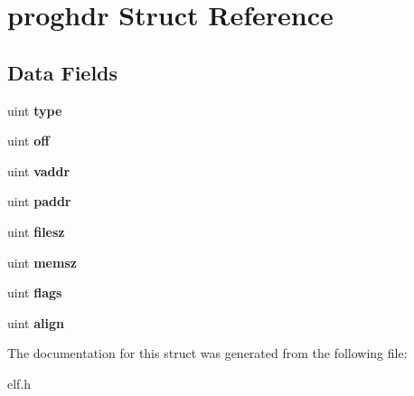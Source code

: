 \hypertarget{structproghdr}{}\section{proghdr Struct Reference}
\label{structproghdr}
\subsection*{Data Fields}
\begin{DoxyCompactItemize}
\item 
\mbox{\label{structproghdr_a42ea22dcdaa75a9cbdf7cd366b85e9ea}} 
uint {\bfseries type}
\item 
\mbox{\label{structproghdr_a979532386fd448596cc5046339a2cd2d}} 
uint {\bfseries off}
\item 
\mbox{\label{structproghdr_a6fa1051e19935bbedc5eaf086f5330b4}} 
uint {\bfseries vaddr}
\item 
\mbox{\label{structproghdr_af65905aa5c4ccb33aac7dad5783e14d9}} 
uint {\bfseries paddr}
\item 
\mbox{\label{structproghdr_a95dee0f1864ec1602f1ff6998ac00df0}} 
uint {\bfseries filesz}
\item 
\mbox{\label{structproghdr_a9f703ade191af1054b3de797d8167d89}} 
uint {\bfseries memsz}
\item 
\mbox{\label{structproghdr_ab3ad45ccf4b38dec384206ecbd099076}} 
uint {\bfseries flags}
\item 
\mbox{\label{structproghdr_a9a7d455ad6830cd1a37aa324911880ec}} 
uint {\bfseries align}
\end{DoxyCompactItemize}


The documentation for this struct was generated from the following file\+:\begin{DoxyCompactItemize}
\item 
elf.\+h\end{DoxyCompactItemize}
